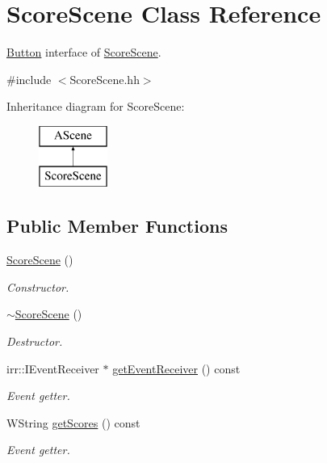\hypertarget{classScoreScene}{}\section{Score\+Scene Class Reference}
\label{classScoreScene}


\hyperlink{classButton}{Button} interface of \hyperlink{classScoreScene}{Score\+Scene}.  




{\ttfamily \#include $<$Score\+Scene.\+hh$>$}

Inheritance diagram for Score\+Scene\+:\begin{figure}[H]
\begin{center}
\leavevmode
\includegraphics[height=2.000000cm]{classScoreScene}
\end{center}
\end{figure}
\subsection*{Public Member Functions}
\begin{DoxyCompactItemize}
\item 
\hyperlink{classScoreScene_a832799285cf03c37c18c83d0adde2baa}{Score\+Scene} ()
\begin{DoxyCompactList}\small\item\em Constructor. \end{DoxyCompactList}\item 
\hyperlink{classScoreScene_a1d3866f2c756fea86ec9adfb0a3eeb36}{$\sim$\+Score\+Scene} ()
\begin{DoxyCompactList}\small\item\em Destructor. \end{DoxyCompactList}\item 
irr\+::\+I\+Event\+Receiver $\ast$ \hyperlink{classScoreScene_ae398ba58a33b3605a0c71265202534e2}{get\+Event\+Receiver} () const
\begin{DoxyCompactList}\small\item\em Event getter. \end{DoxyCompactList}\item 
W\+String \hyperlink{classScoreScene_af82d6c841dc42c42d83202d2c7ddf8c9}{get\+Scores} () const
\begin{DoxyCompactList}\small\item\em Event getter. \end{DoxyCompactList}\end{DoxyCompactItemize}


